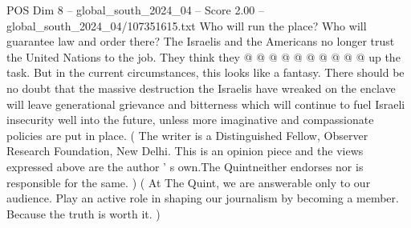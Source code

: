 \begin{textsample}{POS Dim 8 – global\_south\_2024\_04 – Score 2.00 – global\_south\_2024\_04/107351615.txt}
Who will run the place?
Who will guarantee law and order there?
The Israelis and the Americans no longer trust the United Nations to the job.
They think they @ @ @ @ @ @ @ @ @ @ up the task.
But in the current circumstances, this looks like a fantasy.
There should be no doubt that the massive destruction the Israelis have wreaked on the enclave will leave generational grievance and bitterness which will continue to fuel Israeli insecurity well into the future, unless more imaginative and compassionate policies are put in place. ( The writer is a Distinguished Fellow, Observer Research Foundation, New Delhi.
This is an opinion piece and the views expressed above are the author ' s own.The Quintneither endorses nor is responsible for the same. ) ( At The Quint, we are answerable only to our audience.
Play an active role in shaping our journalism by becoming a member.
Because the truth is worth it. )

\end{textsample}
